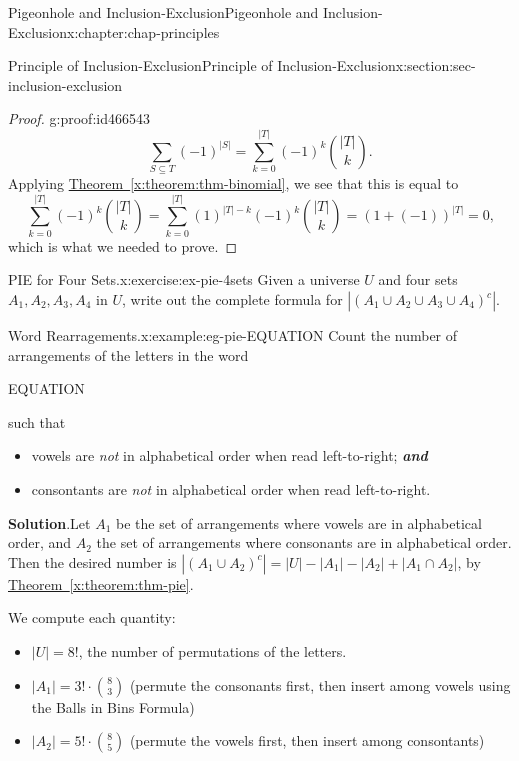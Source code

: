 \documentclass[oneside,10pt,]{book}
\newcommand{\blocktitlefont}{\relax}
\newcommand{\xreffont}{\relax}
\newcommand{\alert}[1]{\textbf{\textit{#1}}}
\numberwithin{equation}{section}
\begin{document}
\begin{chapterptx}{Pigeonhole and Inclusion-Exclusion}{}{Pigeonhole and Inclusion-Exclusion}{}{}{x:chapter:chap-principles}
\begin{sectionptx}{Principle of Inclusion-Exclusion}{}{Principle of Inclusion-Exclusion}{}{}{x:section:sec-inclusion-exclusion}
\begin{proof}{}{g:proof:id466543}
\begin{equation*}
\sum_{S \subseteq T} (-1)^{|S|} = \sum_{k=0}^{|T|} (-1)^k\binom{|T|}{k}\text{.}
\end{equation*}
Applying \hyperref[x:theorem:thm-binomial]{Theorem~{\xreffont\ref{x:theorem:thm-binomial}}}, we see that this is equal to%
\begin{equation*}
\sum_{k=0}^{|T|} (-1)^k\binom{|T|}{k} = \sum_{k=0}^{|T|} (1)^{|T|-k}(-1)^k\binom{|T|}{k} = \left( 1 + (-1) \right)^{|T|} = 0\text{,}
\end{equation*}
which is what we needed to prove.%
\end{proof}
\begin{inlineexercise}{PIE for Four Sets.}{x:exercise:ex-pie-4sets}%
Given a universe \(U\) and four sets \(A_1, A_2, A_3, A_4\) in \(U\), write out the complete formula for \(|(A_1 \cup A_2 \cup A_3 \cup A_4)^c|\).%
\end{inlineexercise}
\begin{example}{Word Rearragements.}{x:example:eg-pie-EQUATION}%
Count the number of arrangements of the letters in the word%
\begin{center}
EQUATION%
\end{center}
\par
such that%
\begin{itemize}[label=\textbullet]
\item{}vowels are \emph{not} in alphabetical order when read left-to-right; \alert{and}%
\item{}consontants are \emph{not} in alphabetical order when read left-to-right.%
\end{itemize}
%
\par\smallskip%
\noindent\textbf{\blocktitlefont Solution}.\hypertarget{g:solution:id466913}{}\quad{}Let \(A_1\) be the set of arrangements where vowels are in alphabetical order, and \(A_2\) the set of arrangements where consonants are in alphabetical order. Then the desired number is \(|(A_1 \cup A_2)^c| = |U| - |A_1| - |A_2| + |A_1 \cap A_2|\), by \hyperref[x:theorem:thm-pie]{Theorem~{\xreffont\ref{x:theorem:thm-pie}}}.%
\par
We compute each quantity:%
\begin{itemize}[label=\textbullet]
\item{}\(|U| = 8!\), the number of permutations of the letters.%
\item{}\(|A_1| = 3! \cdot \binom{8}{3}\) (permute the consonants first, then insert among vowels using the Balls in Bins Formula)%
\item{}\(|A_2| = 5! \cdot \binom{8}{5}\) (permute the vowels first, then insert among consontants)%

\end{itemize}
\end{example}
\end{sectionptx}
\end{chapterptx}
\end{document}
